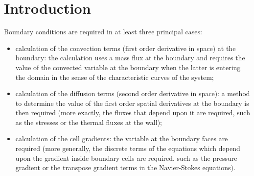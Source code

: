 
%
%
%
%

\section{Introduction}

Boundary conditions are required in at least three principal cases:
 
\begin{itemize}
\item calculation of the convection terms (first order derivative in space) at
the boundary: the calculation uses a mass flux at the boundary and requires the 
value of the convected variable at the boundary when the latter is entering 
the domain in the sense of the characteristic curves of the system;
\item calculation of the diffusion terms (second order derivative
in space):
a method to determine the value of the first order spatial derivatives 
at the boundary is then required 
 (more exactly, the fluxes that depend upon it are required,
 such as the stresses or the thermal fluxes at the wall);
\item calculation of the cell  gradients: the variable at the boundary faces
 are required (more generally, the discrete terms of the equations which depend
upon the gradient inside boundary cells are required, such as the pressure gradient or
the transpose gradient terms in the Navier-Stokes equations). 
\end{itemize}

